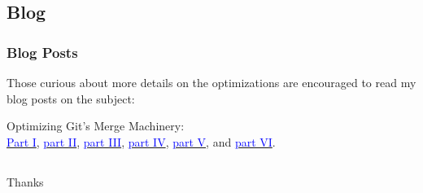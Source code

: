 \documentclass[compress,t]{beamer}
\begin{document}
\subsection{Blog}

\begin{frame}
  \frametitle{Blog Posts}

  Those curious about more details on the optimizations are encouraged
  to read my blog posts on the subject:

  \qquad
  \begin{center}
  Optimizing Git's Merge Machinery:\\ \href{https://blog.palantir.com/optimizing-gits-merge-machinery-1-127ceb0ef2a1}{\textcolor{blue}{Part I}}, 
  \href{https://blog.palantir.com/optimizing-gits-merge-machinery-2-d81391b97878}{\textcolor{blue}{part II}}, 
  \href{https://blog.palantir.com/optimizing-gits-merge-machinery-3-2dc7c7436978}{\textcolor{blue}{part III}}, 
  \href{https://blog.palantir.com/optimizing-gits-merge-machinery-part-iv-5bbc4703d050}{\textcolor{blue}{part IV}}, 
  \href{https://blog.palantir.com/optimizing-gits-merge-machinery-part-v-46ff3710633e}{\textcolor{blue}{part V}}, and
  \href{https://blog.palantir.com/optimizing-gits-merge-machinery-6-7bf887a131d8}{\textcolor{blue}{part VI}}.
  \end{center}

\end{frame}


\subsection{}
\begin{frame}
  \vfill
  \vspace*{2\baselineskip}
  {\Huge
  \begin{center}Thanks\end{center}
  }
  \vfill
\end{frame}

\end{document}
